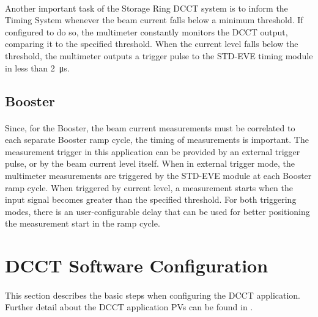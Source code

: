 \documentclass[openany]{article}
\begin{document}
		\paragraph{} Another important task of the Storage Ring DCCT system is to inform the Timing System whenever the beam current falls below a minimum threshold. If configured to do so, the multimeter constantly monitors the DCCT output, comparing it to the specified threshold. When the current level falls below the threshold, the multimeter outputs a trigger pulse to the STD-EVE timing module in less than \SI{2}{\micro\second}.

	\subsection{Booster} 

		\paragraph{} Since, for the Booster, the beam current measurements must be correlated to each separate Booster ramp cycle, the timing of measurements is important. The measurement trigger in this application can be provided by an external trigger pulse, or by the beam current level itself. When in external trigger mode, the multimeter measurements are triggered by the STD-EVE module at each Booster ramp cycle. When triggered by current level, a measurement starts when the input signal becomes greater than the specified threshold. For both triggering modes, there is an user-configurable delay that can be used for better positioning the measurement start in the ramp cycle.

\section{DCCT Software Configuration}

	\paragraph{} This section describes the basic steps when configuring the DCCT application. Further detail about the DCCT application PVs can be found in \emph{}.

	\bigskip
	\noindent{}
\end{document}
